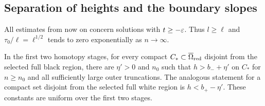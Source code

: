 \subsection{Separation of heights and the boundary slopes}\label{d:collar-estimates}

All estimates from now on concern solutions with $t\ge-\varepsilon$.
Thus $l\ge\ell$ and $\tau_0/\ell=\ell^{1/2}$ tends to zero
exponentially as $n\to\infty$.

\begin{lemma}\label{d:height-separation}
In the first two homotopy stages, for every compact
$C_*\subset\overline\Omega_{\rm red}$ disjoint from the selected
full black region, there are $\eta'>0$ and $n_0$ such that
$h>b_-+\eta'$ on $C_*$ for $n\ge n_0$ and all sufficiently large
outer truncations.  The analogous statement for a compact set
disjoint from the selected full white region is $h<b_+-\eta'$.
These constants are uniform over the first two stages.
\end{lemma}
